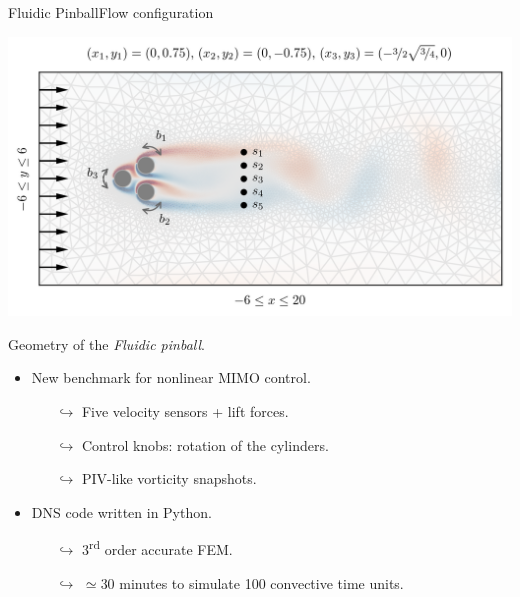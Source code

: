 \documentclass[usenames,dvipsnames,svgnames,10pt,aspectratio=169]{beamer}
\begin{document}
\begin{frame}[t, c]{Fluidic Pinball}{Flow configuration}
	\begin{minipage}{.48\textwidth}
		\centering
		\includegraphics[width=.95\textwidth]{pinball_geometry}

		Geometry of the \emph{Fluidic pinball}.
	\end{minipage}%
	\hfill
	\begin{minipage}{.48\textwidth}
		\begin{itemize}
			\item New benchmark for nonlinear MIMO control.
			\begin{itemize}
				\item[$\hookrightarrow$] Five velocity sensors + lift forces.
				\item[$\hookrightarrow$] Control knobs: rotation of the cylinders.
				\item[$\hookrightarrow$] PIV-like vorticity snapshots.
			\end{itemize}

			\bigskip

			\item DNS code written in Python.
			\begin{itemize}
				\item[$\hookrightarrow$] 3\textsuperscript{rd} order accurate FEM.
				\item[$\hookrightarrow$] $\simeq 30$ minutes to simulate 100 convective time units.
			\end{itemize}

		\end{itemize}
	\end{minipage}

	\vspace{1cm}
\end{frame}
\end{document}
